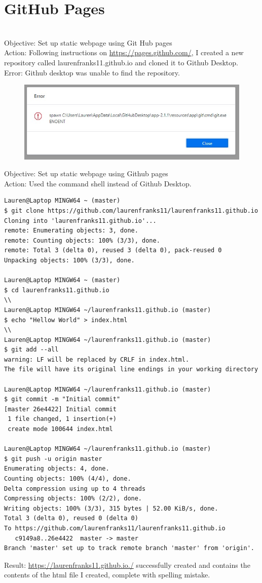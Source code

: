 \documentclass{article}
\begin{document}
\section{GitHub Pages}\\
Objective: Set up static webpage using Git Hub pages\\
Action: Following instructions on \href{https://pages.github.com/}{https://pages.github.com/}, I created a new repository called laurenfranks11.github.io and cloned it to Github Desktop.\\
Error: Github desktop was unable to find the repository.
\begin{figure}[htp]
    \centering
    \includegraphics[width=15cm]{github desktop error.jpg}
\end{figure}
\newpage
Objective: Set up static webpage using Github pages\\
Action: Used the command shell instead of Github Desktop.
\newline
\begin{verbatim}
Lauren@Laptop MINGW64 ~ (master)
$ git clone https://github.com/laurenfranks11/laurenfranks11.github.io
Cloning into 'laurenfranks11.github.io'...
remote: Enumerating objects: 3, done.
remote: Counting objects: 100% (3/3), done. 
remote: Total 3 (delta 0), reused 3 (delta 0), pack-reused 0 
Unpacking objects: 100% (3/3), done.

Lauren@Laptop MINGW64 ~ (master)
$ cd laurenfranks11.github.io
\\
Lauren@Laptop MINGW64 ~/laurenfranks11.github.io (master)
$ echo "Hellow World" > index.html
\\
Lauren@Laptop MINGW64 ~/laurenfranks11.github.io (master)
$ git add --all
warning: LF will be replaced by CRLF in index.html.
The file will have its original line endings in your working directory

Lauren@Laptop MINGW64 ~/laurenfranks11.github.io (master)
$ git commit -m "Initial commit"
[master 26e4422] Initial commit
 1 file changed, 1 insertion(+)
 create mode 100644 index.html

Lauren@Laptop MINGW64 ~/laurenfranks11.github.io (master)
$ git push -u origin master
Enumerating objects: 4, done.
Counting objects: 100% (4/4), done.
Delta compression using up to 4 threads
Compressing objects: 100% (2/2), done.
Writing objects: 100% (3/3), 315 bytes | 52.00 KiB/s, done.
Total 3 (delta 0), reused 0 (delta 0)
To https://github.com/laurenfranks11/laurenfranks11.github.io
   c9149a8..26e4422  master -> master
Branch 'master' set up to track remote branch 'master' from 'origin'.
\end{verbatim}

\noindent Result: \href{https://laurenfranks11.github.io./}{https://laurenfranks11.github.io./} successfully created and contains the contents of the html file I created, complete with spelling mistake. 
\end{document}
